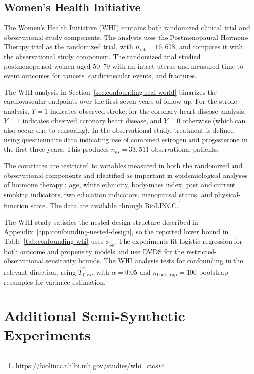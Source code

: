 \subsection{Women's Health Initiative}
\label{app:confounding-whi-details}

The Women's Health Initiative (WHI) contains both randomized clinical trial and observational study components. The analysis uses the Postmenopausal Hormone Therapy trial as the randomized trial, with \(n_{\mathrm{rct}}=16{,}608\), and compares it with the observational study component. The randomized trial studied postmenopausal women aged \(50\)--\(79\) with an intact uterus and measured time-to-event outcomes for cancers, cardiovascular events, and fractures.

The WHI analysis in Section~\ref{sec:confounding-real-world} binarizes the cardiovascular endpoints over the first seven years of follow-up. For the stroke analysis, \(Y=1\) indicates observed stroke; for the coronary-heart-disease analysis, \(Y=1\) indicates observed coronary heart disease, and \(Y=0\) otherwise (which can also occur due to censoring). In the observational study, treatment is defined using questionnaire data indicating use of combined estrogen and progesterone in the first three years. This produces \(n_{\mathrm{os}}=33{,}511\) observational patients.

The covariates are restricted to variables measured in both the randomized and observational components and identified as important in epidemiological analyses of hormone therapy \citep{prentice2005combined}: age, white ethnicity, body-mass index, past and current smoking indicators, two education indicators, menopausal status, and physical-function score. The data are available through BioLINCC.\footnote{\url{https://biolincc.nhlbi.nih.gov/studies/whi_ctos}}

The WHI study satisfies the nested-design structure described in Appendix~\ref{app:confounding-nested-design}, so the reported lower bound in Table~\ref{tab:confounding-whi} uses \(\widehat{\phi}_{\widetilde{\mathrm{os}}}\). The experiments fit logistic regression for both outcome and propensity models and use DVDS \citep{dorn2021doubly} for the restricted-observational sensitivity bounds. The WHI analysis tests for confounding in the relevant direction, using \(\widehat{T}^+_{\Gamma,\widetilde{\mathrm{os}}}\), with \(\alpha=0.05\) and \(n_{\mathrm{bootstrap}}=100\) bootstrap resamples for variance estimation.

\section{Additional Semi-Synthetic Experiments}
\label{app:confounding-additional-experiments}


